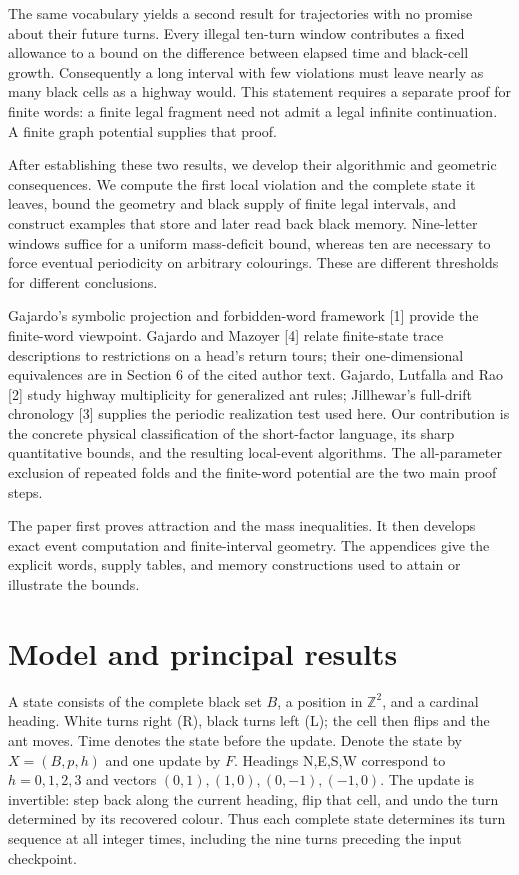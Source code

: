 \documentclass[
  11pt,
]{article}
\begin{document}
The same vocabulary yields a second result for trajectories with no promise
about their future turns. Every illegal ten-turn window contributes a fixed
allowance to a bound on the difference between elapsed time and black-cell
growth. Consequently a long interval with few violations must leave nearly
as many black cells as a highway would. This statement requires a separate
proof for finite words: a finite legal fragment need not admit a legal
infinite continuation. A finite graph potential supplies that proof.

After establishing these two results, we develop their algorithmic and
geometric consequences. We compute the first local violation and the complete
state it leaves, bound the geometry and black supply of finite legal
intervals, and construct examples that store and later read back black
memory. Nine-letter windows suffice for a uniform mass-deficit bound,
whereas ten are necessary to force eventual periodicity on arbitrary
colourings. These are different thresholds for different conclusions.

Gajardo's symbolic projection and forbidden-word framework {[}1{]}
provide the finite-word viewpoint. Gajardo and Mazoyer {[}4{]} relate
finite-state trace descriptions to restrictions on a head's return tours;
their one-dimensional equivalences are in Section 6 of the cited author text.
Gajardo, Lutfalla and Rao {[}2{]} study highway multiplicity for generalized
ant rules; Jillhewar's full-drift chronology {[}3{]} supplies the periodic
realization test used here. Our contribution is the concrete physical
classification of the short-factor language, its sharp quantitative bounds,
and the resulting local-event algorithms. The all-parameter exclusion of
repeated folds and the finite-word potential are the two main proof steps.

The paper first proves attraction and the mass inequalities. It then develops
exact event computation and finite-interval geometry. The appendices give the
explicit words, supply tables, and memory constructions used to attain or
illustrate the bounds.

\section{Model and principal results}\label{model-and-principal-results}

A state consists of the complete black set \(B\), a position in
\(\mathbb Z^2\), and a cardinal heading. White turns right (R), black
turns left (L); the cell then flips and the ant moves. Time denotes the
state before the update. Denote the state by $X=(B,p,h)$ and one update
by $F$. Headings N,E,S,W correspond to $h=0,1,2,3$ and vectors
$(0,1),(1,0),(0,-1),(-1,0)$. The update is invertible: step back along the
current heading, flip that cell, and undo the turn determined by its recovered
colour. Thus each complete state determines its turn sequence at all integer
times, including the nine turns preceding the input checkpoint.
\end{document}
